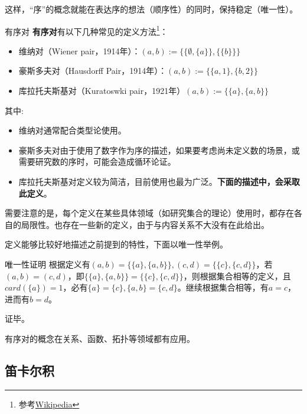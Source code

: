 这样，“序”的概念就能在表达序的想法（顺序性）的同时，保持稳定（唯一性）。

\begin{definition}{有序对}
\textbf{有序对}有以下几种常见的定义方法\footnote{参考\href{https://en.wikipedia.org/wiki/Ordered_pair}{Wikipedia}}：
\begin{itemize}
\item 维纳对（Wiener pair，1914年）：$(a, b):= \{\{\emptyset,\{ a\}\}, \{\{b\}\}\} $
\item 豪斯多夫对（Hausdorff Pair，1914年）：$ (a, b):= \{\{a, 1\}, \{b, 2\}\} $
\item 库拉托夫斯基对（Kuratoswki pair，1921年）$(a, b) := \{\{a\}, \{a, b\}\}$
\end{itemize}
\end{definition}
其中:
\begin{itemize}
\item 维纳对通常配合类型论使用。
\item 豪斯多夫对由于使用了数字作为序的描述，如果要考虑尚未定义数的场景，或需要研究数的序时，可能会造成循环论证。
\item 库拉托夫斯基对定义较为简洁，目前使用也最为广泛。\textbf{下面的描述中，会采取此定义}。
\end{itemize}

需要注意的是，每个定义在某些具体领域（如研究集合的理论）使用时，都存在各自的局限性。也存在一些新的定义，由于与内容关系不大没有在此给出。

定义能够比较好地描述之前提到的特性，下面以唯一性举例。
\begin{example}{唯一性证明}
根据定义有$(a, b) = \{\{a\}, \{a, b\}\} , (c, d) = \{\{c\}, \{c, d\}\} $，若$(a, b)=(c,d)$，即$\{\{a\}, \{a, b\}\}=\{\{c\}, \{c, d\}\}$，则根据集合相等的定义，且$card(\{a\})=1$，必有$\{a\}=\{c\},\{a, b\}=\{c, d\}$。继续根据集合相等，有$a=c$，进而有$b=d$。

证毕。
\end{example}

有序对的概念在关系、函数、拓扑等领域都有应用。

\subsection{笛卡尔积}

